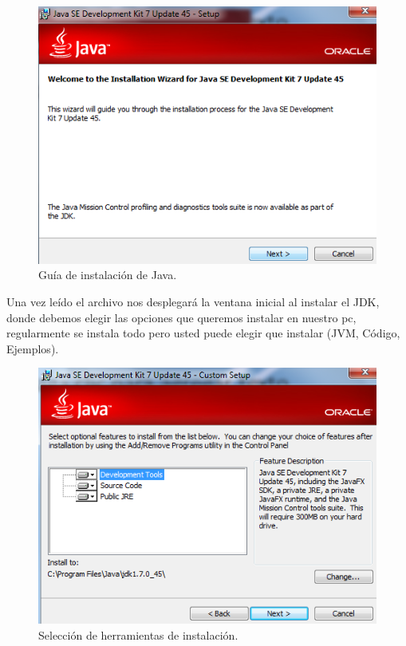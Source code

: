 \begin{figure}[H]
	\begin{center}
		\includegraphics[scale=.4]{images/instalaciones/java/img_java_3}
		\caption{Guía de instalación de Java.}
	\end{center}
\end{figure} 
 
 Una vez
leído el archivo nos desplegará la ventana inicial al instalar el JDK, donde
debemos elegir las opciones que queremos instalar en nuestro pc, regularmente se
instala todo pero usted puede elegir que instalar (JVM, Código, Ejemplos).

\begin{figure}[H]
	\begin{center}
		\includegraphics[scale=.4]{images/instalaciones/java/img_java_4}
		\caption{Selección de herramientas de instalación.}
	\end{center}
\end{figure}

